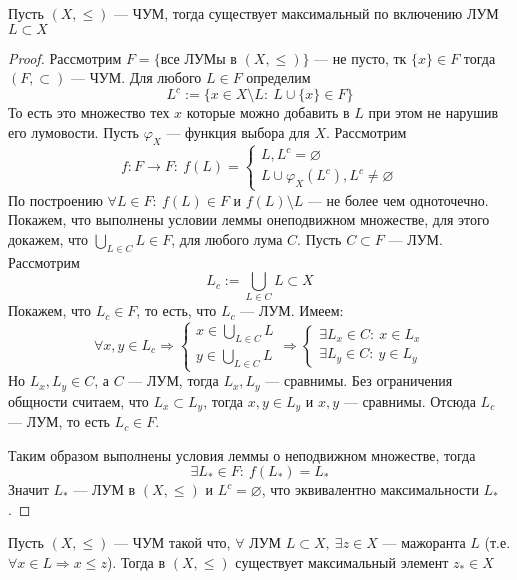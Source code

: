 \begin{theorem}
	\label{th:Hausdorf}
	Пусть $(X, \leq)$ --- ЧУМ, тогда существует максимальный по включению ЛУМ $L \subset X$
\end{theorem}

	\begin{proof}
	Рассмотрим $F = \{\text{все ЛУМы в }(X, \leq)\}$ --- не пусто, тк $\{x\} \in F$ тогда $(F, \subset)$ --- ЧУМ. Для любого $L \in F$ определим 
	$$
	L^c := \{x \in X \setminus L :\ L \cup \{x\} \in F\}
	$$
	То есть это множество тех $x$ которые можно добавить в $L$ при этом не нарушив его лумовости. 
	Пусть $\varphi_X$ --- функция выбора для $X$. Рассмотрим 
	$$
	f: F \rightarrow F: \ f(L) = \begin{cases}
		L , L^c = \varnothing \\
		L \cup \varphi_X(L^c), L^c \neq \varnothing 
	\end{cases}
	$$
	По построению $\forall L \in F: \ f(L) \in F$ и $f(L)\setminus L$ --- не более чем одноточечно. Покажем, что выполнены условии леммы онеподвижном множестве, для этого докажем, что $\bigcup\limits_{L \in C}L \in F$, для любого лума $C$. Пусть $C \subset F$ --- ЛУМ. Рассмотрим 
	$$
	L_c := \bigcup\limits_{L \in C}L \subset X
	$$
	Покажем, что $L_c \in F$, то есть, что $L_c$ --- ЛУМ. Имеем:
	$$
	\forall x,y \in L_c \Rightarrow 
	\begin{cases}
		x \in \bigcup\limits_{L \in C} L \\
		y \in \bigcup\limits_{L \in C} L 
	\end{cases} 
	\Rightarrow 
	\begin{cases}
		\exists L_x \in C:\ x \in L_x \\
		\exists L_y \in C:\ y \in L_y 
	\end{cases}
	$$
	Но $L_x, L_y \in C$, а $C$ --- ЛУМ, тогда $L_x, L_y$ --- сравнимы. Без ограничения общности считаем, что $L_x \subset L_y$, тогда $x, y \in L_y$ и $x,y$ --- сравнимы. Отсюда $L_c$ --- ЛУМ, то есть $L_c \in F$.
	
	Таким образом выполнены условия леммы о неподвижном множестве, тогда
	$$
	\exists L_* \in F: \ f(L_*) = L_*
	$$
	Значит $L_*$ --- ЛУМ в $(X, \leq)$ и $L^c = \varnothing$, что эквивалентно максимальности $L_*$. 
\end{proof}

\begin{lemma}[Цорна]\label{lem:zorn}
	Пусть $(X, \leq)$ --- ЧУМ такой что, $\forall$ ЛУМ $L \subset X, ~ \exists z \in X$ --- мажоранта $L$ (т.е. $\forall x \in L \Rightarrow x \leq z$). Тогда в $(X, \leq)$ существует максимальный элемент $z_* \in X$
\end{lemma}

